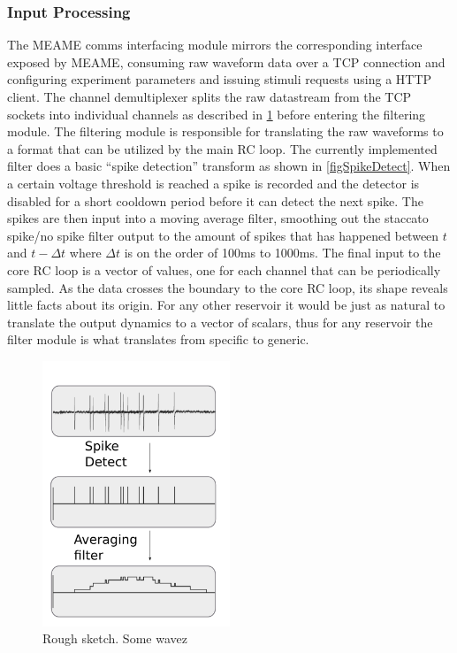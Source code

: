 \subsubsection{Input Processing}
The MEAME comms interfacing module mirrors the corresponding interface exposed
by MEAME, consuming raw waveform data over a TCP connection and configuring
experiment parameters and issuing stimuli requests using a HTTP client.
The channel demultiplexer splits the raw datastream from the TCP sockets into
individual channels as described in \ref{figWaves} before entering the filtering
module.
The filtering module is responsible for translating the raw waveforms to a
format that can be utilized by the main RC loop.
The currently implemented filter does a basic ``spike detection'' transform
as shown in \ref{figSpikeDetect}.
When a certain voltage threshold is reached a spike is recorded and the detector
is disabled for a short cooldown period before it can detect the next spike.
The spikes are then input into a moving average filter, smoothing out the
staccato spike/no spike filter output to the amount of spikes that has happened
between $t$ and $t - \Delta t$ where $\Delta t$ is on the order of 100ms to 1000ms.
The final input to the core RC loop is a vector of values, one for each channel
that can be periodically sampled.
As the data crosses the boundary to the core RC loop, its shape reveals little
facts about its origin.
For any other reservoir it would be just as natural to translate the output
dynamics to a vector of scalars, thus for any reservoir the filter module is
what translates from specific to generic.
\begin{figure}[h!]
  \centering
  \includegraphics[width=0.5\textwidth]{fig/Transforms.png}
  \caption{Rough sketch.
    Some wavez
  }
  \label{figWaves}
\end{figure}

